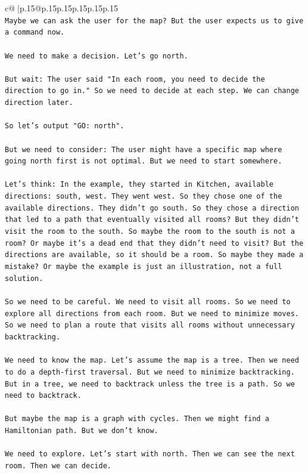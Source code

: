 \documentclass{article}
\begin{document}
{\begin{supertabular}{c@{$\;$}|p{.15\linewidth}@{}p{.15\linewidth}p{.15\linewidth}p{.15\linewidth}p{.15\linewidth}p{.15\linewidth}}
{{{\\ 
\texttt{Maybe we can ask the user for the map? But the user expects us to give a command now.} \\
\\ 
\texttt{We need to make a decision. Let's go north.} \\
\\ 
\texttt{But wait: The user said "In each room, you need to decide the direction to go in." So we need to decide at each step. We can change direction later.} \\
\\ 
\texttt{So let's output "GO: north".} \\
\\ 
\texttt{But we need to consider: The user might have a specific map where going north first is not optimal. But we need to start somewhere.} \\
\\ 
\texttt{Let's think: In the example, they started in Kitchen, available directions: south, west. They went west. So they chose one of the available directions. They didn't go south. So they chose a direction that led to a path that eventually visited all rooms? But they didn't visit the room to the south. So maybe the room to the south is not a room? Or maybe it's a dead end that they didn't need to visit? But the directions are available, so it should be a room. So maybe they made a mistake? Or maybe the example is just an illustration, not a full solution.} \\
\\ 
\texttt{So we need to be careful. We need to visit all rooms. So we need to explore all directions from each room. But we need to minimize moves. So we need to plan a route that visits all rooms without unnecessary backtracking.} \\
\\ 
\texttt{We need to know the map. Let's assume the map is a tree. Then we need to do a depth{-}first traversal. But we need to minimize backtracking. But in a tree, we need to backtrack unless the tree is a path. So we need to backtrack.} \\
\\ 
\texttt{But maybe the map is a graph with cycles. Then we might find a Hamiltonian path. But we don't know.} \\
\\ 
\texttt{We need to explore. Let's start with north. Then we can see the next room. Then we can decide.} \\
}}}
\end{supertabular}}
\end{document}
